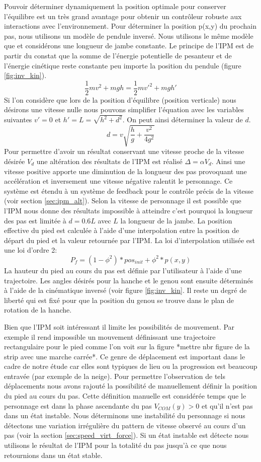 \documentclass{llncs}
\begin{document}
Pouvoir déterminer dynamiquement la position optimale pour conserver l'équilibre est un très grand avantage pour obtenir un contrôleur robuste aux interactions avec l'environnement. Pour déterminer la position p(x,y) du prochain pas, nous utilisons un modèle de pendule inversé. Nous utilisons le même modèle que \cite{coros2010generalized} et considérons une longueur de jambe constante.
Le principe de l'IPM est de partir du constat que la somme de l'énergie potentielle de pesanteur et de l'énergie cinétique reste constante peu importe la position du pendule (figure \ref{fig:inv_kin}). 
\[
\frac{1}{2}mv^2+mgh=\frac{1}{2}mv'^2+mgh'
\]
Si l'on considère que lors de la position d'équilibre (position verticale) nous désirons une vitesse nulle nous pouvons simplifier l'équation avec les variables suivantes \(v'=0\) et \(h'=L=\sqrt{h^2+d^2}\). On peut ainsi déterminer la valeur de \(d\).
\[
d=v\sqrt{\frac{h}{g}+\frac{v^2}{4g^2}}
\]
Pour permettre d'avoir un résultat conservant une vitesse proche de la vitesse désirée \(V_d\) une altération des résultats de l'IPM est réalisé \(\Delta=\alpha V_d\). Ainsi une vitesse positive apporte une diminution de la longueur des pas provoquant une accélération et inversement une vitesse négative ralentit le personnage. Ce système est étendu à un système de feedback pour le contrôle précis de la vitesse (voir section \ref{sec:ipm_alt}).
Selon la vitesse de personnage il est possible que l'IPM nous donne des résultats impossible à atteindre c'est pourquoi la longueur des pas est limitée à \(d=0.6L\) avec \(L\) la longueur de la jambe.
La position effective du pied est calculée à l'aide d'une interpolation entre la position de départ du pied et la valeur retournée par l'IPM. La loi d'interpolation utilisée est une loi d'ordre 2:
\[
P_f=(1-\phi^2)*pos_{init}+\phi^2*p(x,y)
\]
La hauteur du pied au cours du pas est définie par l'utilisateur à l'aide d'une trajectoire.
Les angles désirés pour la hanche et le genou sont ensuite déterminés à l'aide de la cinématique inversé (voir figure \ref{fig:inv_kin}. Il reste un degré de liberté qui est fixé pour que la position du genou se trouve dans le plan de rotation de la hanche.

Bien que l'IPM soit intéressant il limite les possibilités de mouvement. Par exemple il rend impossible un mouvement définissant une trajectoire rectangulaire pour le pied comme l'on voit sur la figure *mettre nbr figure de la strip avec une marche carrée*. Ce genre de déplacement est important dans le cadre de notre étude car elles sont typiques de lieu ou la progression est beaucoup entravée (par exemple de la neige). Pour permettre l'observation de tels déplacements nous avons rajouté la possibilité de manuellement définir la position du pied au cours du pas. Cette définition manuelle est considérée temps que le personnage est dans la phase ascendante du pas \(V_{COM}(y)>0\) et qu'il n'est pas dans un état instable. Nous déterminons une instabilité du personnage si nous détectons une variation irrégulière du pattern de vitesse observé au cours d'un pas (voir la section \ref{sec:speed_virt_force}). Si un état instable est détecte nous utilisons le résultat de l'IPM pour la totalité du pas jusqu'à ce que nous retournions dans un état stable.
\end{document}
